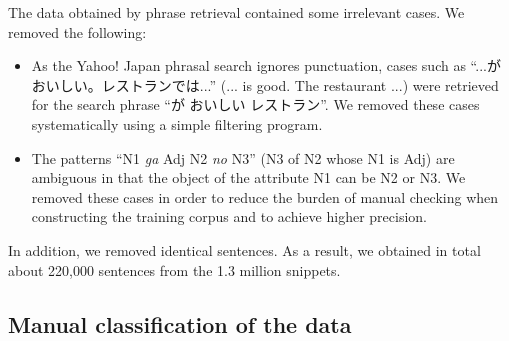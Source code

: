 \documentclass[english]{jnlp_1.4}
\begin{document}
The data obtained by phrase retrieval contained some irrelevant cases.
We removed the following:
\begin{itemize}
\item As the Yahoo! Japan phrasal search ignores punctuation, 
cases such as ``...がおいしい。レストランでは...'' (... is good. The
restaurant ...) were retrieved for the search phrase 
\mbox{``が} おいしい レストラン''. We removed these cases systematically using
a simple filtering program.
\item The patterns ``N1 {\it ga} Adj N2 {\it no} N3'' (N3 of N2 whose N1 is Adj) are
ambiguous in that the object of the attribute N1 can be N2 or N3. We
removed these cases in order to reduce the burden of manual checking when 
constructing the training corpus and to achieve higher precision.
\end{itemize}
In addition, we removed identical sentences. As a result, we obtained in total
about 220,000 sentences from the 1.3 million snippets.

\vspace{0.3\baselineskip}

\subsection{Manual classification of the data}
\end{document}
